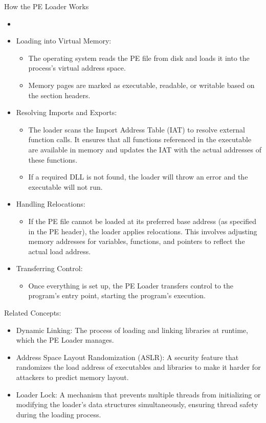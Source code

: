 How the PE Loader Works
\begin{itemize}
    \item 
    \item Loading into Virtual Memory:
    \begin{itemize}
        \item The operating system reads the PE file from disk and loads it into the process’s virtual address space.
        \item Memory pages are marked as executable, readable, or writable based on the section headers.
    \end{itemize}
    
    
    \item Resolving Imports and Exports:
    \begin{itemize}
        \item The loader scans the Import Address Table (IAT) to resolve external function calls. It ensures that all functions referenced in the executable are available in memory and updates the IAT with the actual addresses of these functions.
        \item If a required DLL is not found, the loader will throw an error and the executable will not run.
    \end{itemize}
    \item Handling Relocations:
    \begin{itemize}
        \item If the PE file cannot be loaded at its preferred base address (as specified in the PE header), the loader applies relocations. This involves adjusting memory addresses for variables, functions, and pointers to reflect the actual load address.
    \end{itemize}
    
    \item Transferring Control:
    \begin{itemize}
        \item Once everything is set up, the PE Loader transfers control to the program’s entry point, starting the program’s execution.
    \end{itemize}
\end{itemize}


Related Concepts:
\begin{itemize}
    \item Dynamic Linking: The process of loading and linking libraries at runtime, which the PE Loader manages.
    \item Address Space Layout Randomization (ASLR): A security feature that randomizes the load address of executables and libraries to make it harder for attackers to predict memory layout.
    \item Loader Lock: A mechanism that prevents multiple threads from initializing or modifying the loader's data structures simultaneously, ensuring thread safety during the loading process.
\end{itemize}


